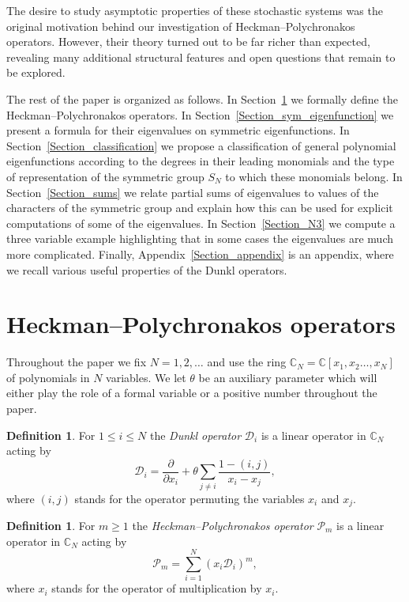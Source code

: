 \documentclass[11pt]{article}
\theoremstyle{definition}
\newtheorem{defi}[theo]{Definition}
\numberwithin{equation}{section}
\newcommand{\D}{\mathcal D}
\newcommand{\PP}{\mathcal P}
\begin{document}
The desire to study asymptotic properties of these stochastic systems was the original motivation behind our investigation of Heckman--Polychronakos operators. However, their theory turned out to be far richer than expected, revealing many additional structural features and open questions that remain to be explored.

The rest of the paper is organized as follows. In Section~\ref{Section_HP_operators} we formally define the Heckman--Polychronakos operators. In Section~\ref{Section_sym_eigenfunction} we present a formula for their eigenvalues on symmetric eigenfunctions. In Section~\ref{Section_classification} we propose a classification of general polynomial eigenfunctions according to the degrees in their leading monomials and the type of representation of the symmetric group $S_N$ to which these monomials belong. In Section~\ref{Section_sums} we relate partial sums of eigenvalues to values of the characters of the symmetric group and explain how this can be used for explicit computations of some of the eigenvalues. In Section~\ref{Section_N3} we compute a three variable example highlighting that in some cases the eigenvalues are much more complicated. Finally, Appendix~\ref{Section_appendix} is an appendix, where we recall various useful properties of the Dunkl operators.


\section{Heckman--Polychronakos operators}

\label{Section_HP_operators}

Throughout the paper we fix $N=1,2,\dots$ and use the ring $\mathbb C_N=\mathbb C[x_1,x_2\dots,x_N]$ of polynomials in $N$ variables.  We let $\theta$ be an auxiliary parameter which will either play the
role of a formal variable or a positive number throughout the paper.
\begin{defi} \label{Definition_Dunkl}
 For $1\le i\le N$ the \emph{Dunkl operator} $\D_i$ is a linear operator in $\mathbb C_N$ acting by
 \begin{equation}
 \D_i= \frac{\partial}{\partial x_i}+\theta \sum_{j\ne i} \frac{1-(i,j)}{x_i-x_j},
 \end{equation}
 where $(i,j)$ stands for the operator permuting the variables $x_i$ and $x_j$.
\end{defi}
\begin{defi} \label{Definition_HP_operator}
 For $m\ge 1$ the \emph{Heckman--Polychronakos operator} $\PP_m$ is a linear operator in $\mathbb C_N$ acting by
 \begin{equation}
 \PP_m= \sum_{i=1}^N (x_i \D_i)^m,
 \end{equation}
 where $x_i$ stands for the operator of multiplication by $x_i$.
\end{defi}
\end{document}
